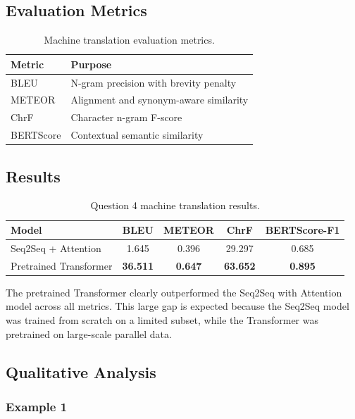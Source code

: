 \documentclass[11pt,a4paper]{article}
\begin{document}
\subsection{Evaluation Metrics}

\begin{table}[H]
\centering
\caption{Machine translation evaluation metrics.}
\begin{tabular}{ll}
\toprule
Metric & Purpose \\
\midrule
BLEU & N-gram precision with brevity penalty \\
METEOR & Alignment and synonym-aware similarity \\
ChrF & Character n-gram F-score \\
BERTScore & Contextual semantic similarity \\
\bottomrule
\end{tabular}
\end{table}

\subsection{Results}

\begin{table}[H]
\centering
\caption{Question 4 machine translation results.}
\begin{tabular}{lcccc}
\toprule
Model & BLEU & METEOR & ChrF & BERTScore-F1 \\
\midrule
Seq2Seq + Attention & 1.645 & 0.396 & 29.297 & 0.685 \\
Pretrained Transformer & \textbf{36.511} & \textbf{0.647} & \textbf{63.652} & \textbf{0.895} \\
\bottomrule
\end{tabular}
\end{table}

The pretrained Transformer clearly outperformed the Seq2Seq with Attention model across all metrics. This large gap is expected because the Seq2Seq model was trained from scratch on a limited subset, while the Transformer was pretrained on large-scale parallel data.

\subsection{Qualitative Analysis}

\subsubsection{Example 1}
\end{document}
